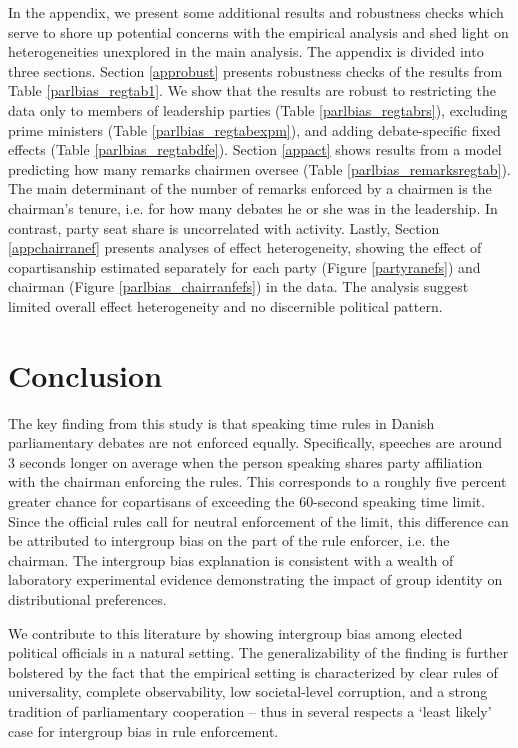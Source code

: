 \documentclass[12pt,a4paper]{article}
\begin{document}
In the appendix, we present some additional results and robustness checks which serve to shore up potential concerns with the empirical analysis and shed light on heterogeneities unexplored in the main analysis. The appendix is divided into three sections. Section \ref{approbust} presents robustness checks of the results from Table \ref{parlbias_regtab1}. We show that the results are robust to restricting the data only to members of leadership parties (Table \ref{parlbias_regtabrs}), excluding prime ministers (Table \ref{parlbias_regtabexpm}), and adding debate-specific fixed effects (Table \ref{parlbias_regtabdfe}). Section \ref{appact} shows results from a model predicting how many remarks chairmen oversee (Table \ref{parlbias_remarksregtab}). The main determinant of the number of remarks enforced by a chairmen is the chairman's tenure, i.e. for how many debates he or she was in the leadership. In contrast, party seat share is uncorrelated with activity. Lastly, Section \ref{appchairranef} presents analyses of effect heterogeneity, showing the effect of copartisanship estimated separately for each party (Figure \ref{partyranefs}) and chairman (Figure \ref{parlbias_chairranfefs}) in the data. The analysis suggest limited overall effect heterogeneity and no discernible political pattern.


\section{Conclusion}\label{conc}

\noindent The key finding from this study is that speaking time rules in Danish parliamentary debates are not enforced equally. Specifically, speeches are around 3 seconds longer on average when the person speaking shares party affiliation with the chairman enforcing the rules. This corresponds to a roughly five percent greater chance for copartisans of exceeding the 60-second speaking time limit. Since the official rules call for neutral enforcement of the limit, this difference can be attributed to intergroup bias on the part of the rule enforcer, i.e. the chairman. The intergroup bias explanation is consistent with a wealth of laboratory experimental evidence demonstrating the impact of group identity on distributional preferences.

We contribute to this literature by showing intergroup bias among elected political officials in a natural setting. The generalizability of the finding is further bolstered by the fact that the empirical setting is characterized by clear rules of universality, complete observability, low societal-level corruption, and a strong tradition of parliamentary cooperation -- thus in several respects a `least likely' case for intergroup bias in rule enforcement.
\end{document}

